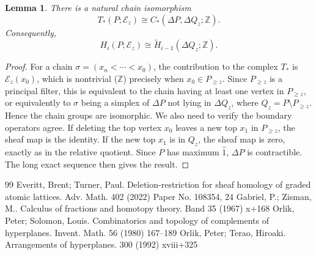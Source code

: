 \documentclass[10pt,a4paper]{amsart}
\numberwithin{equation}{section}
\newtheorem{lem}[thm]{Lemma}
\numberwithin{equation}{section}
\newcommand{\Z}{\mathbb{Z}}
\newcommand{\E}{\mathscr{E}}
\begin{document}
\begin{lem}
    There is a natural chain isomorphism
    \[
    T_*(P;\E_z)\cong C_*(\Delta P,\Delta Q_z;\Z).
    \]
    Consequently,
    \[
    H_i(P;\E_z)\cong \widetilde{H}_{i-1}(\Delta Q_z;\Z).
    \]
\end{lem}

\begin{proof}
    For a chain $\sigma=(x_n<\cdots< x_0)$, the contribution to the complex $T_*$ is $\E_z(x_0)$, which is nontrivial ($\Z$) precisely when $x_0\in P_{\geq z}$. Since $P_{\geq z}$ is a principal filter, this is equivalent to the chain having at least one vertex in $P_{\geq z}$, or equivalently to $\sigma$ being a simplex of $\Delta P$ not lying in $\Delta Q_z$, where $Q_z=P\setminus P_{\geq z}$. Hence the chain groups are isomorphic. We also need to verify the boundary operators agree. If deleting the top vertex $x_0$ leaves a new top $x_1$ in $P_{\geq z}$, the sheaf map is the identity. If the new top $x_1$ is in $Q_z$, the sheaf map is zero, exactly as in the relative quotient. Since $P$ has maximum $\hat{1}$, $\Delta P$ is contractible. The long exact sequence then gives the result.
\end{proof}


\begin{thebibliography}{99}
 Everitt, Brent; Turner, Paul. Deletion-restriction for sheaf homology of graded atomic lattices. Adv. Math. 402 (2022) Paper No. 108354, 24
 Gabriel, P.; Zisman, M.. Calculus of fractions and homotopy theory. Band 35 (1967) x+168
 Orlik, Peter; Solomon, Louis. Combinatorics and topology of complements of hyperplanes. Invent. Math. 56 (1980) 167--189
 Orlik, Peter; Terao, Hiroaki. Arrangements of hyperplanes. 300 (1992) xviii+325
\end{thebibliography}
\end{document}
